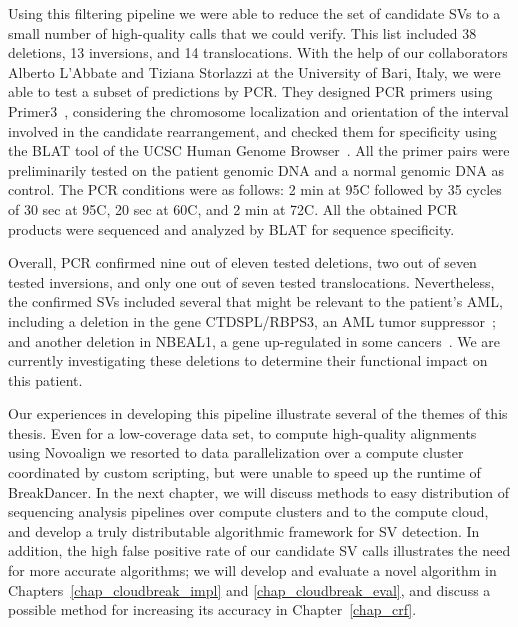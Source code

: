 Using this filtering pipeline we were able to reduce the set of candidate SVs to a small number of high-quality calls that we could verify. This list included 38 deletions, 13 inversions, and 14 translocations. With the help of our collaborators Alberto L'Abbate and Tiziana Storlazzi at the University of Bari, Italy, we were able to test a subset of predictions by PCR. They designed PCR primers using Primer3~\cite{Untergasser01082012}, considering the chromosome localization and orientation of the interval involved in the candidate rearrangement, and checked them for specificity using the BLAT tool of the UCSC Human Genome Browser~\cite{Kent01042002}. All the primer pairs were preliminarily tested on the patient genomic DNA and a normal genomic DNA as control. The PCR conditions were as follows: 2 min at 95\degree C followed by 35 cycles of 30 sec at 95\degree C, 20 sec at 60\degree C, and 2 min at 72\degree C. All the obtained PCR products were sequenced and analyzed by BLAT for sequence specificity. 

Overall, PCR confirmed nine out of eleven tested deletions, two out of seven tested inversions, and only one out of seven tested translocations. Nevertheless, the confirmed SVs included several that might be relevant to the patient's AML, including a deletion in the gene CTDSPL/RBPS3, an AML tumor suppressor~\cite{Zheng:2012kk}; and another deletion in NBEAL1, a gene up-regulated in some cancers~\cite{Chen:2004jo}. We are currently investigating these deletions to determine their functional impact on this patient. 

Our experiences in developing this pipeline illustrate several of the themes of this thesis. Even for a low-coverage data set, to compute high-quality alignments using Novoalign we resorted to data parallelization over a compute cluster coordinated by custom scripting, but were unable to speed up the runtime of BreakDancer. In the next chapter, we will discuss methods to easy distribution of sequencing analysis pipelines over compute clusters and to the compute cloud, and develop a truly distributable algorithmic framework for SV detection. In addition, the high false positive rate of our candidate SV calls illustrates the need for more accurate algorithms; we will develop and evaluate a novel algorithm in Chapters~\ref{chap_cloudbreak_impl} and \ref{chap_cloudbreak_eval}, and discuss a possible method for increasing its accuracy in Chapter~\ref{chap_crf}.